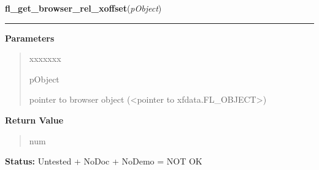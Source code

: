 \hspace{.8\funcindent}\begin{boxedminipage}{\funcwidth}

    \raggedright \textbf{fl\_get\_browser\_rel\_xoffset}(\textit{pObject})

    \vspace{-1.5ex}

    \rule{\textwidth}{0.5\fboxrule}
\setlength{\parskip}{2ex}
\setlength{\parskip}{1ex}
      \textbf{Parameters}
      \vspace{-1ex}

      \begin{quote}
        \begin{Ventry}{xxxxxxx}

          \item[pObject]

          pointer to browser object ({\textless}pointer to 
          xfdata.FL\_OBJECT{\textgreater})

        \end{Ventry}

      \end{quote}

      \textbf{Return Value}
    \vspace{-1ex}

      \begin{quote}
      num

      \end{quote}

\textbf{Status:} Untested + NoDoc + NoDemo = NOT OK



    \end{boxedminipage}

    \label{xformslib:library:fl_set_browser_xoffset}

    \vspace{0.5ex}

